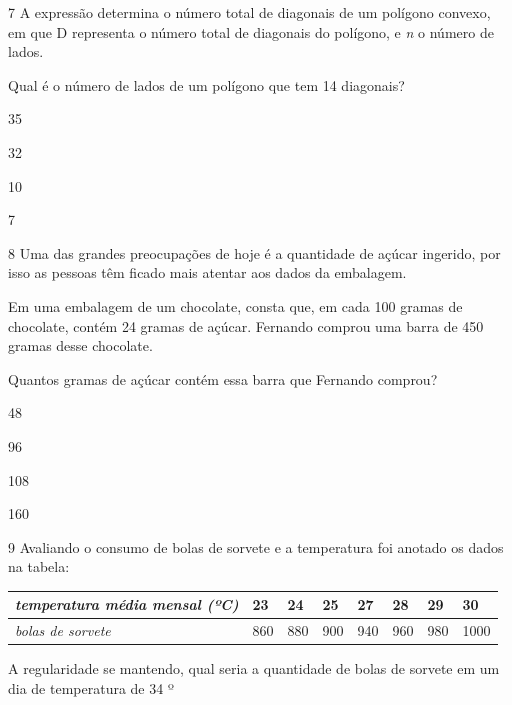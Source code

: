 \pagebreak
\num{7} A expressão determina o número total de diagonais de um polígono convexo, em que D representa o número total de diagonais do polígono, e \emph{n} o número de lados. 

Qual é o número de lados de um polígono que tem 14 diagonais?

\begin{escolha}
\item 35

\item 32

\item 10

\item 7
\end{escolha}



\num{8} Uma das grandes preocupações de hoje é a quantidade de açúcar ingerido, por isso as pessoas têm ficado mais atentar aos dados da embalagem.

Em uma embalagem de um chocolate, consta que, em cada 100 gramas de
chocolate, contém 24 gramas de açúcar. Fernando comprou uma barra de 450
gramas desse chocolate.

Quantos gramas de açúcar contém essa barra que Fernando comprou?

\begin{escolha}
\item 48 

\item 96 

\item 108 

\item 160
\end{escolha}

\num{9} Avaliando o consumo de bolas de sorvete e a temperatura foi anotado
os dados na tabela:

\begin{longtable}[]{@{}llllllll@{}}
\toprule\noalign{}
\emph{temperatura média mensal (ºC)} & \textbf{23} & \textbf{24} &
\textbf{25} & \textbf{27} & \textbf{28} & \textbf{29} & \textbf{30} \\
\midrule\noalign{}
\endhead
\bottomrule\noalign{}
\endlastfoot
\emph{bolas de sorvete} & 860 & 880 & 900 & 940 & 960 & 980 & 1000 \\
\end{longtable}

A regularidade se mantendo, qual seria a quantidade de bolas de sorvete
em um dia de temperatura de 34 º

